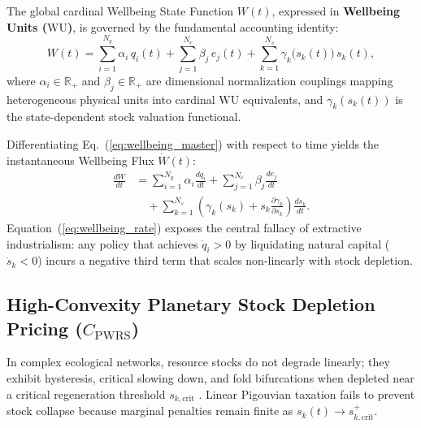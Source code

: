 \documentclass[aps,pre,twocolumn,10pt,superscriptaddress,amsmath,amssymb,amsfonts,floatfix,showkeys]{revtex4-2}
\begin{document}
The global cardinal Wellbeing State Function $W(t)$, expressed in \textbf{Wellbeing Units ($\text{WU}$)}, is governed by the fundamental accounting identity:
\begin{equation}
    W(t) = \sum_{i=1}^{N_q} \alpha_i \, q_i(t) + \sum_{j=1}^{N_e} \beta_j \, e_j(t) + \sum_{k=1}^{N_s} \gamma_k\big(s_k(t)\big) \, s_k(t),
    \label{eq:wellbeing_master}
\end{equation}
where $\alpha_i \in \mathbb{R}_{+}$ and $\beta_j \in \mathbb{R}_{+}$ are dimensional normalization couplings mapping heterogeneous physical units into cardinal $\text{WU}$ equivalents, and $\gamma_k(s_k(t))$ is the state-dependent stock valuation functional.

Differentiating Eq.~(\ref{eq:wellbeing_master}) with respect to time yields the instantaneous Wellbeing Flux $\dot{W}(t)$:
\begin{equation}
\begin{aligned}
    \frac{dW}{dt} &= \sum_{i=1}^{N_q} \alpha_i \frac{dq_i}{dt} + \sum_{j=1}^{N_e} \beta_j \frac{de_j}{dt} \\
    &\quad + \sum_{k=1}^{N_s} \left( \gamma_k(s_k) + s_k \frac{\partial \gamma_k}{\partial s_k} \right) \frac{ds_k}{dt}.
\end{aligned}
\label{eq:wellbeing_rate}
\end{equation}
Equation~(\ref{eq:wellbeing_rate}) exposes the central fallacy of extractive industrialism: any policy that achieves $\dot{q}_i > 0$ by liquidating natural capital ($\dot{s}_k < 0$) incurs a negative third term that scales non-linearly with stock depletion.

\subsection{High-Convexity Planetary Stock Depletion Pricing (\texorpdfstring{$C_{\text{PWRS}}$}{CPWRS})}

In complex ecological networks, resource stocks do not degrade linearly; they exhibit hysteresis, critical slowing down, and fold bifurcations when depleted near a critical regeneration threshold $s_{k,\text{crit}}$ \cite{Rockstrom2009}. Linear Pigouvian taxation fails to prevent stock collapse because marginal penalties remain finite as $s_k(t) \to s_{k,\text{crit}}^{+}$.
\end{document}
